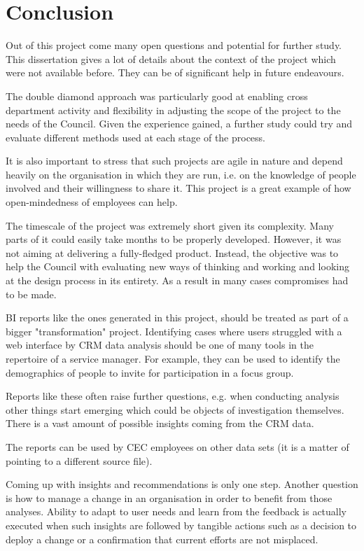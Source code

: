 
\chapter{Conclusion}

Out of this project come many open questions and potential for further study. This dissertation gives a lot of details about the context of the project which were not available before. They can be of significant help in future endeavours.

The double diamond approach was particularly good at enabling cross department activity and flexibility in adjusting the scope of the project to the needs of the Council. Given the experience gained, a further study could try and evaluate different methods used at each stage of the process.

It is also important to stress that such projects are agile in nature and depend heavily on the organisation in which they are run, i.e. on the knowledge of people involved and their willingness to share it. This project is a great example of how open-mindedness of employees can help.

The timescale of the project was extremely short given its complexity. Many parts of it could easily take months to be properly developed. However, it was not aiming at delivering a fully-fledged product. Instead, the objective was to help the Council with evaluating new ways of thinking and working and looking at the design process in its entirety. As a result in many cases compromises had to be made.

BI reports like the ones generated in this project, should be treated as part of a bigger "transformation" project. Identifying cases where users struggled with a web interface by CRM data analysis should be one of many tools in the repertoire of a service manager. For example, they can be used to identify the demographics of people to invite for participation in a focus group.

Reports like these often raise further questions, e.g. when conducting analysis other things start emerging which could be objects of investigation themselves. There is a vast amount of possible insights coming from the CRM data.

The reports can be used by CEC employees on other data sets (it is a matter of pointing to a different source file). 

Coming up with insights and recommendations is only one step. Another question is how to manage a change in an organisation in order to benefit from those analyses. Ability to adapt to user needs and learn from the feedback is actually executed when such insights are followed by tangible actions such as a decision to deploy a change or a confirmation that current efforts are not misplaced.